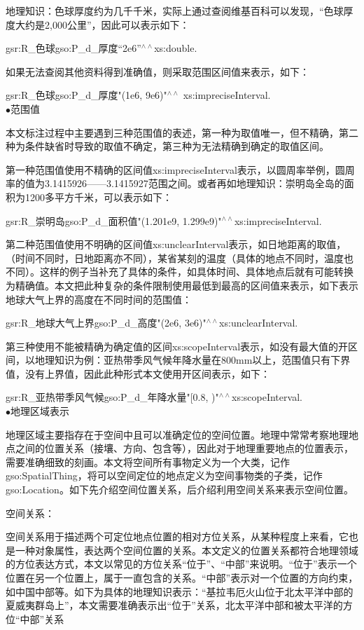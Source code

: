 地理知识：色球厚度约为几千千米，实际上通过查阅维基百科可以发现，“色球厚度大约是2,000公里”，因此可以表示如下：

gsr:R\_色球\quad gso:P\_d\_厚度\quad “2e6”$^{\land\land}$xs:double\quad .

如果无法查阅其他资料得到准确值，则采取范围区间值来表示，如下：

gsr:R\_色球\quad gso:P\_d\_厚度\quad "(1e6, 9e6)"$^{\land\land}$ xs:impreciseInterval\quad .
\\

$\bullet$范围值

本文标注过程中主要遇到三种范围值的表述，第一种为取值唯一，但不精确，第二种为条件缺省时导致的取值不确定，第三种为无法精确到确定的取值区间。

第一种范围值使用不精确的区间值xs:impreciseInterval表示，以圆周率举例，圆周率的值为3.1415926——3.1415927范围之间。或者再如地理知识：崇明岛全岛的面积为1200多平方千米，可以表示如下：

gsr:R\_崇明岛\quad gso:P\_d\_面积值\quad "(1.201e9, 1.299e9)"$^{\land\land}$xs:impreciseInterval\quad .

第二种范围值使用不明确的区间值xs:unclearInterval表示，如日地距离的取值，（时间不同时，日地距离亦不同），某省某刻的温度（具体的地点不同时，温度也不同）。这样的例子当补充了具体的条件，如具体时间、具体地点后就有可能转换为精确值。本文把此种复杂的条件限制使用最低到最高的区间值来表示，如下表示地球大气上界的高度在不同时间的范围值：

gsr:R\_地球大气上界\quad gso:P\_d\_高度\quad "(2e6,  3e6)"$^{\land\land}$xs:unclearInterval\quad .

第三种使用不能被精确为确定值的区间xs:scopeInterval表示，如没有最大值的开区间，以地理知识为例：亚热带季风气候年降水量在800mm以上，范围值只有下界值，没有上界值，因此此种形式本文使用开区间表示，如下：


gsr:R\_亚热带季风气候\quad gso:P\_d\_年降水量\quad "[0.8, )"$^{\land\land}$xs:scopeInterval\quad .
\\

$\bullet$地理区域表示

地理区域主要指存在于空间中且可以准确定位的空间位置。地理中常常考察地理地点之间的位置关系（接壤、方向、包含等），因此对于地理重要地点的位置表示，需要准确细致的刻画。本文将空间所有事物定义为一个大类，记作gso:SpatialThing，将可以空间定位的地点定义为空间事物类的子类，记作gso:Location。如下先介绍空间位置关系，后介绍利用空间关系来表示空间位置。

空间关系：

空间关系用于描述两个可定位地点位置的相对方位关系，从某种程度上来看，它也是一种对象属性，表达两个空间位置的关系。本文定义的位置关系都符合地理领域的方位表达方式，本文以常见的方位关系“位于”、“中部”来说明。“位于”表示一个位置在另一个位置上，属于一直包含的关系。“中部”表示对一个位置的方向约束，如中国中部等。如下为具体的地理知识表示：“基拉韦厄火山位于北太平洋中部的夏威夷群岛上”，本文需要准确表示出“位于”关系，北太平洋中部和被太平洋的方位“中部”关系

